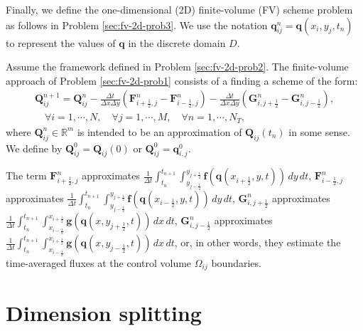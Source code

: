 Finally, we define the one-dimensional (2D) finite-volume (FV)
scheme problem as follows in Problem \ref{sec:fv-2d-prob3}.
We use the notation $\mathbf{q}^n_{ij} = \mathbf{q}(x_i, y_j, t_n)$
to represent the values of $\mathbf{q}$ in the discrete domain $D$.
\begin{prob}[2D-FV scheme]
	\label{sec:fv-2d-prob3}
	Assume the framework defined in Problem \ref{sec:fv-2d-prob2}.
	The finite-volume approach of Problem \ref{sec:fv-2d-prob1}
	consists of a finding a scheme of the form:
	\begin{align*}
		\mathbf{Q}_{ij}^{n+1} =  \mathbf{Q}_{ij}^{n} -
		\frac{\Delta t}{\Delta x \Delta y} (\mathbf{F}_{i+\frac{1}{2},j}^{n} - \mathbf{F}_{i-\frac{1}{2},j}^{n}) -
		\frac{\Delta t}{\Delta x \Delta y} (\mathbf{G}_{i,j+\frac{1}{2}}^{n} - \mathbf{G}_{i,j-\frac{1}{2}}^{n}),
		\\ \nonumber \quad \forall i = 1, \cdots, N, \quad \forall j = 1, \cdots, M,
		\quad \forall n = 1, \cdots, N_T,
	\end{align*}
	where $\mathbf{Q}_{ij}^{n} \in \mathbb{R}^m$ is intended to be an approximation
	of $\mathbf{Q}_{ij}(t_{n})$ in some sense. We define by $\mathbf{Q}_{ij}^{0} = \mathbf{Q}_{ij}(0)$ or
	$\mathbf{Q}_{ij}^{0} = \mathbf{q}^0_{i,j}$.
	
	The term $\mathbf{F}_{i+\frac{1}{2}, j}^{n}$ approximates
	$\frac{1}{\Delta t}\int_{t_n}^{t_{n+1}} \int_{y_{j-\frac{1}{2}}}^{y_{j+\frac{1}{2}}} \mathbf{f}(\mathbf{q}(x_{i+\frac{1}{2}}, y, t)) \,dy \,dt $,
	$\mathbf{F}_{i-\frac{1}{2},j}^{n}$ approximates
	$\frac{1}{\Delta t}\int_{t_n}^{t_{n+1}} \int_{y_{j-\frac{1}{2}}}^{y_{j+\frac{1}{2}}} \mathbf{f}(\mathbf{q}(x_{i-\frac{1}{2}}, y, t)) \,dy \,dt $,
	$\mathbf{G}_{i, j+\frac{1}{2}}^{n}$ approximates
	$\frac{1}{\Delta t}\int_{t_n}^{t_{n+1}} \int_{x_{i-\frac{1}{2}}}^{x_{i+\frac{1}{2}}} \mathbf{g}(\mathbf{q}(x, y_{j+\frac{1}{2}}, t)) \,dx \,dt $,
	$\mathbf{G}_{i, j-\frac{1}{2}}^{n}$ approximates
	$\frac{1}{\Delta t}\int_{t_n}^{t_{n+1}} \int_{x_{i-\frac{1}{2}}}^{x_{i+\frac{1}{2}}} \mathbf{g}(\mathbf{q}(x, y_{j-\frac{1}{2}}, t)) \,dx \,dt $,
	or, in other words, they estimate the time-averaged fluxes at the control volume $\Omega_{ij}$ boundaries.
\end{prob}



\section{Dimension splitting}
\label{sec-dimsplit}


\citep{lin:1997}
\citep{lin:2004}
\citep{putmanthesis:2007}
\citep{putman:2007}